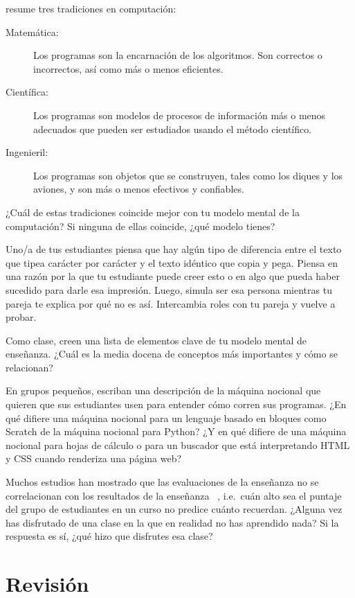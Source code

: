 
\cite{Tedr2008} resume tres tradiciones en computación:

\begin{description}

\item[Matemática:]
  Los programas son la encarnación de los algoritmos. 
Son correctos o incorrectos, así como más o menos eficientes. 

\item[Científica:]
Los programas son modelos de procesos de información más o menos adecuados
que pueden ser estudiados usando el método científico.

\item[Ingenieril:]
Los programas son objetos que se construyen, tales como los diques y los aviones,
y son más o menos efectivos y confiables.

\end{description}
¿Cuál de estas tradiciones coincide mejor con tu modelo mental de la computación?
Si ninguna de ellas coincide, ¿qué modelo tienes?

Uno/a de tus estudiantes piensa que hay algún tipo de diferencia entre el texto
que tipea carácter por carácter y el texto idéntico que copia y pega.
Piensa en una razón por la que tu estudiante puede creer esto
o en algo que pueda haber sucedido para darle esa impresión.
Luego, simula ser esa persona mientras tu pareja te explica por qué no es así.
Intercambia roles con tu pareja y vuelve a probar.


Como clase,
creen una lista de elementos clave de tu modelo mental de enseñanza.
¿Cuál es la media docena de conceptos más importantes y cómo se relacionan?


En grupos pequeños,
escriban una descripción de la máquina nocional que quieren que sus estudiantes usen para entender cómo corren sus programas.
¿En qué difiere una máquina nocional para un lenguaje basado en bloques como Scratch de la máquina nocional para Python?
¿Y en qué difiere de una máquina nocional para hojas de cálculo o para un buscador que está interpretando HTML y CSS cuando renderiza una página web?

Muchos estudios han mostrado que
las evaluaciones de la enseñanza no se correlacionan con los resultados de la enseñanza ~\cite{Star2014,Uttl2017},
i.e.\ cuán alto sea el puntaje del grupo de estudiantes en un curso no predice cuánto recuerdan.
¿Alguna vez has disfrutado de una clase en la que en realidad no has aprendido nada?
Si la respuesta es sí, ¿qué hizo que disfrutes esa clase?

\newpage
\section*{Revisión}


